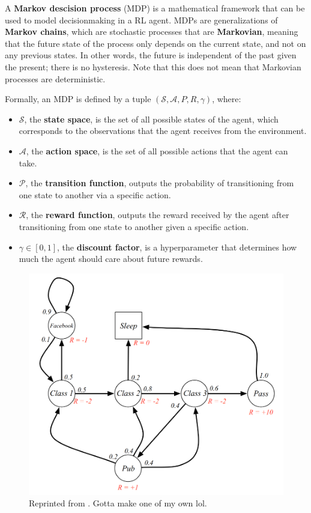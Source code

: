 \documentclass[12pt]{report}
\theoremstyle{definition}
\theoremstyle{remark}
\begin{document}
A \textbf{Markov descision process} (MDP) is a mathematical framework that can be used to model decisionmaking in a RL agent. MDPs are generalizations of \textbf{Markov chains}, which are stochastic processes that are \textbf{Markovian}, meaning that the future state of the process only depends on the current state, and not on any previous states. In other words, the future is independent of the past given the present; there is no hysteresis. Note that this does not mean that Markovian processes are deterministic.

Formally, an MDP is defined by a tuple $(\mathcal{S}, \mathcal{A}, P, R, \gamma)$, where:
\begin{itemize}
    \item $\mathcal{S}$, the \textbf{state space}, is the set of all possible states of the agent, which corresponds to the observations that the agent receives from the environment.
    \item $\mathcal{A}$, the \textbf{action space}, is the set of all possible actions that the agent can take.
    \item $\mathcal{P}$, the \textbf{transition function}, outputs the probability of transitioning from one state to another via a specific action.
    \item $\mathcal{R}$, the \textbf{reward function}, outputs the reward received by the agent after transitioning from one state to another given a specific action.
    \item $\gamma \in [0,1]$, the \textbf{discount factor}, is a hyperparameter that determines how much the agent should care about future rewards.
\end{itemize}

\begin{figure}[h]
    \centering
    \includegraphics[width=0.7\linewidth]{figs/mdp.png}
    \caption{Reprinted from \cite{silver_lectures_2015}. Gotta make one of my own lol.}
    \label{fig:enter-label}
\end{figure}
\end{document}
